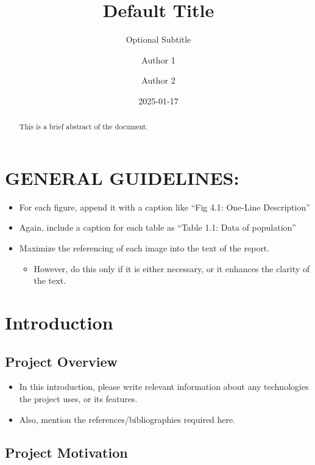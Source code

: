 \documentclass[
  12pt,
  a4paper,
]{book}
\title{Default Title}
\subtitle{Optional Subtitle}
\author{Author 1 \and Author 2}
\date{2025-01-17}
\providecommand{\tightlist}{%
  \setlength{\itemsep}{0pt}\setlength{\parskip}{0pt}}
\begin{document}
\frontmatter
\maketitle
\begin{abstract}
This is a brief abstract of the document.
\end{abstract}

\renewcommand*\contentsname{Table of Contents}
{
\hypersetup{linkcolor=blue}
\setcounter{tocdepth}{2}
\tableofcontents
}
\listoffigures
\listoftables
{}
\mainmatter
\chapter{GENERAL GUIDELINES:}\label{general-guidelines}

\begin{itemize}
\tightlist
\item
  For each figure, append it with a caption like ``Fig 4.1: One-Line
  Description''
\item
  Again, include a caption for each table as ``Table 1.1: Data of
  population''
\item
  Maximize the referencing of each image into the text of the report.

  \begin{itemize}
  \tightlist
  \item
    However, do this only if it is either necessary, or it enhances the
    clarity of the text.
  \end{itemize}
\end{itemize}

\chapter{Introduction}\label{sec:Intro}

\section{Project Overview}\label{sec:IntroOverview}

\begin{itemize}
\item
  In this introduction, please write relevant information about any
  technologies the project uses, or its features.
\item
  Also, mention the references/bibliographies required here.
\end{itemize}

\section{Project Motivation}\label{sec:IntroMotive}
\end{document}
